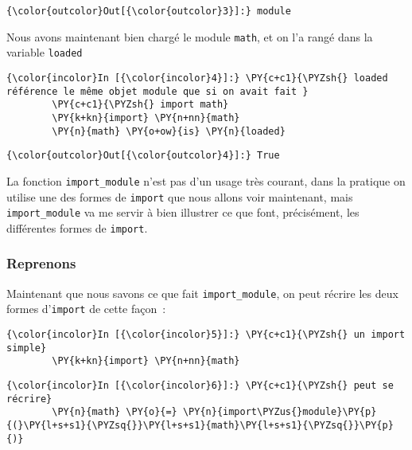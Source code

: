 \begin{Verbatim}[commandchars=\\\{\},frame=single,framerule=0.3mm,rulecolor=\color{cellframecolor}]
{\color{outcolor}Out[{\color{outcolor}3}]:} module
\end{Verbatim}
            
    Nous avons maintenant bien chargé le module \texttt{math}, et on l'a
rangé dans la variable \texttt{loaded}

    \begin{Verbatim}[commandchars=\\\{\},frame=single,framerule=0.3mm,rulecolor=\color{cellframecolor}]
{\color{incolor}In [{\color{incolor}4}]:} \PY{c+c1}{\PYZsh{} loaded référence le même objet module que si on avait fait }
        \PY{c+c1}{\PYZsh{} import math}
        \PY{k+kn}{import} \PY{n+nn}{math}
        \PY{n}{math} \PY{o+ow}{is} \PY{n}{loaded}
\end{Verbatim}


\begin{Verbatim}[commandchars=\\\{\},frame=single,framerule=0.3mm,rulecolor=\color{cellframecolor}]
{\color{outcolor}Out[{\color{outcolor}4}]:} True
\end{Verbatim}
            
    La fonction \texttt{import\_module} n'est pas d'un usage très courant,
dans la pratique on utilise une des formes de \texttt{import} que nous
allons voir maintenant, mais \texttt{import\_module} va me servir à bien
illustrer ce que font, précisément, les différentes formes de
\texttt{import}.

    \hypertarget{reprenons}{%
\subsubsection{Reprenons}\label{reprenons}}

    Maintenant que nous savons ce que fait \texttt{import\_module}, on peut
récrire les deux formes d'\texttt{import} de cette façon~:

    \begin{Verbatim}[commandchars=\\\{\},frame=single,framerule=0.3mm,rulecolor=\color{cellframecolor}]
{\color{incolor}In [{\color{incolor}5}]:} \PY{c+c1}{\PYZsh{} un import simple}
        \PY{k+kn}{import} \PY{n+nn}{math}
\end{Verbatim}


    \begin{Verbatim}[commandchars=\\\{\},frame=single,framerule=0.3mm,rulecolor=\color{cellframecolor}]
{\color{incolor}In [{\color{incolor}6}]:} \PY{c+c1}{\PYZsh{} peut se récrire}
        \PY{n}{math} \PY{o}{=} \PY{n}{import\PYZus{}module}\PY{p}{(}\PY{l+s+s1}{\PYZsq{}}\PY{l+s+s1}{math}\PY{l+s+s1}{\PYZsq{}}\PY{p}{)}
\end{Verbatim}



